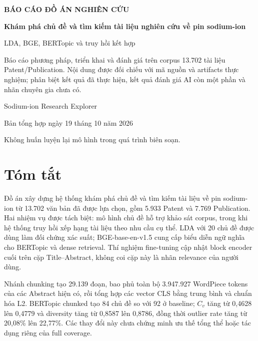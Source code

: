 \documentclass[12pt,a4paper,oneside]{report}
\begin{document}
\hypersetup{pageanchor=false}
\begin{titlepage}
\centering
\vspace*{12mm}
{\Large\bfseries BÁO CÁO ĐỒ ÁN NGHIÊN CỨU\par}
\vspace{15mm}
{\Huge\bfseries\color{navy} Khám phá chủ đề và tìm kiếm tài liệu nghiên cứu về pin sodium-ion\par}
\vspace{10mm}
{\Large LDA, BGE, BERTopic và truy hồi kết hợp\par}
\vspace{17mm}
\begin{minipage}{.87\textwidth}
Báo cáo phương pháp, triển khai và đánh giá trên corpus 13.702 tài liệu Patent/Publication. Nội dung được đối chiếu với mã nguồn và artifacts thực nghiệm; phân biệt kết quả đã thực hiện, kết quả đánh giá AI còn một phần và nhãn chuyên gia chưa có.
\end{minipage}
\vfill
{\large Sodium-ion Research Explorer\par}
{\large Bản tổng hợp ngày 19 tháng 10 năm 2026\par}
\vspace{5mm}
{\small Không huấn luyện lại mô hình trong quá trình biên soạn.\par}
\end{titlepage}
\hypersetup{pageanchor=true}
\chapter*{Tóm tắt}
Đồ án xây dựng hệ thống khám phá chủ đề và tìm kiếm tài liệu về pin sodium-ion từ 13.702 văn bản đã được lựa chọn, gồm 5.933 Patent và 7.769 Publication. Hai nhiệm vụ được tách biệt: mô hình chủ đề hỗ trợ khảo sát corpus, trong khi hệ thống truy hồi xếp hạng tài liệu theo nhu cầu cụ thể. LDA với 20 chủ đề được dùng làm đối chứng xác suất; BGE-base-en-v1.5 cung cấp biểu diễn ngữ nghĩa cho BERTopic và dense retrieval. Thí nghiệm fine-tuning cập nhật block encoder cuối trên cặp Title--Abstract, không coi cặp này là nhãn relevance của người dùng.

Nhánh chunking tạo 29.139 đoạn, bao phủ toàn bộ 3.947.927 WordPiece tokens của các Abstract hiện có, rồi tổng hợp các vector CLS bằng trung bình và chuẩn hóa L2. BERTopic chunked tạo 84 chủ đề so với 92 ở baseline; $C_v$ tăng từ 0,4628 lên 0,4779 và diversity tăng từ 0,8587 lên 0,8786, đồng thời outlier rate tăng từ 20,08\% lên 22,77\%. Các thay đổi này chưa chứng minh ưu thế tổng thể hoặc tác dụng riêng của full coverage.
\end{document}
